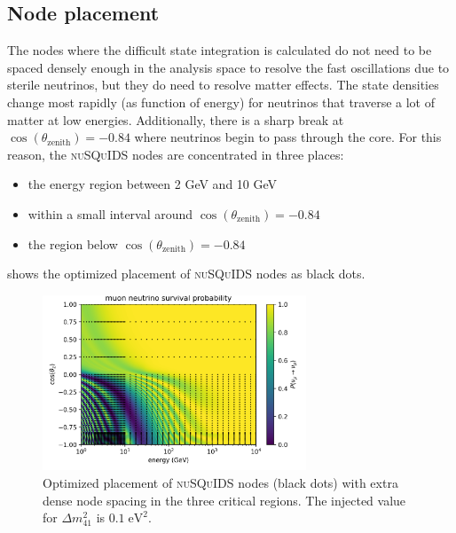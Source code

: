 \subsection{Node placement}
The nodes where the difficult state integration is calculated do not need to be spaced densely enough in the analysis space to resolve the fast oscillations due to sterile neutrinos, but they do need to resolve matter effects. The state densities change most rapidly (as function of energy) for neutrinos that traverse a lot of matter at low energies. Additionally, there is a sharp break at $\cos(\theta_{\mathrm{zenith}})=-0.84$ where neutrinos begin to pass through the core. For this reason, the \textsc{nuSQuIDS} nodes are concentrated in three places:
\begin{itemize}
    \item the energy region between 2 GeV and 10 GeV
    \item within a small interval around $\cos(\theta_{\mathrm{zenith}})=-0.84$
    \item the region below $\cos(\theta_{\mathrm{zenith}})=-0.84$
\end{itemize}
 shows the optimized placement of \textsc{nuSQuIDS} nodes as black dots.

\begin{figure}
    \centering
    \includegraphics[width=0.7\textwidth]{figures/measurement/sterile_analysis/nusquids/0.1eV_sterile_only_height_avg_optim_nodes.png}
    \caption{Optimized placement of \textsc{nuSQuIDS} nodes (black dots) with extra dense node spacing in the three critical regions. The injected value for $\Delta m^2_{41}$ is $0.1\;\mathrm{eV^2}$.}
    \label{fig:nusquids-nodes}
\end{figure}

